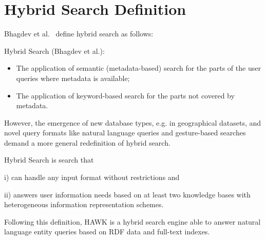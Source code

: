 \section{Hybrid Search Definition}
\label{sec:hybridsearchdefinition}
Bhagdev et al.~\cite{Bhagdev:2008:HSE} define hybrid search as follows:

\begin{definition}
Hybrid Search (Bhagdev et al.):
\begin{itemize}
\item The application of semantic (metadata-based) search for the parts of the user queries 
where metadata is available; 
\item The application of keyword-based search for the parts not covered by metadata.
\end{itemize}
\end{definition}

However, the emergence of new database types, e.g. in geographical datasets, and novel query formats like natural language queries and gesture-based searches demand a more general redefinition of hybrid search.
\begin{definition}
Hybrid Search is search that
\item[i)] can handle any input format without restrictions and
\item[ii)] answers user information needs based on at least two knowledge bases with heterogeneous information representation schemes.
\end{definition}

Following this definition, HAWK is a hybrid search engine able to answer natural language entity queries based on RDF data and full-text indexes.

